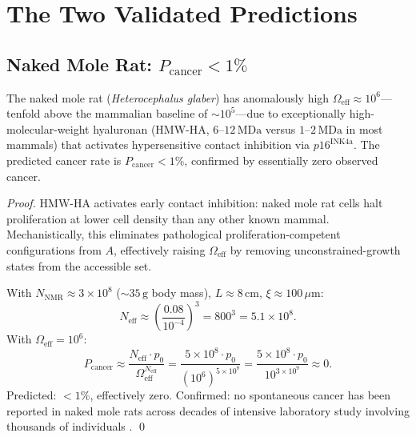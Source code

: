 \section{The Two Validated Predictions}
\label{sec:peto_predictions}

\subsection{Naked Mole Rat: $P_{\mathrm{cancer}} < 1\%$}

\begin{proposition}
\label{prop:naked_mole_rat}
The naked mole rat (\textit{Heterocephalus glaber}) has anomalously high
$\Omega_{\mathrm{eff}} \approx 10^6$---tenfold above the mammalian baseline
of $\sim 10^5$---due to exceptionally high-molecular-weight hyaluronan
(HMW-HA, $6$--$12\,\mathrm{MDa}$ versus $1$--$2\,\mathrm{MDa}$ in most
mammals) that activates hypersensitive contact inhibition via $p16^{\mathrm{INK4a}}$.
The predicted cancer rate is $P_{\mathrm{cancer}} < 1\%$, confirmed by essentially
zero observed cancer.
\end{proposition}

\begin{proof}
HMW-HA activates early contact inhibition: naked mole rat cells halt proliferation
at lower cell density than any other known mammal. Mechanistically, this
eliminates pathological proliferation-competent configurations from $A$,
effectively raising $\Omega_{\mathrm{eff}}$ by removing unconstrained-growth
states from the accessible set.

With $N_{\mathrm{NMR}} \approx 3 \times 10^8$ ($\sim 35\,\mathrm{g}$ body mass),
$L \approx 8\,\mathrm{cm}$, $\xi \approx 100\,\mu\mathrm{m}$:
\begin{equation}
  N_{\mathrm{eff}} \approx \left(\frac{0.08}{10^{-4}}\right)^3 = 800^3 = 5.1 \times 10^8.
\end{equation}
With $\Omega_{\mathrm{eff}} = 10^6$:
\begin{equation}
  P_{\mathrm{cancer}} \approx \frac{N_{\mathrm{eff}} \cdot p_0}{\Omega_{\mathrm{eff}}^{N_{\mathrm{eff}}}}
  = \frac{5 \times 10^8 \cdot p_0}{(10^6)^{5 \times 10^8}}
  = \frac{5 \times 10^8 \cdot p_0}{10^{3 \times 10^9}} \approx 0.
\end{equation}
Predicted: $< 1\%$, effectively zero. Confirmed: no spontaneous cancer has been
reported in naked mole rats across decades of intensive laboratory study involving
thousands of individuals \citep{seluanov2009}. \qed
\end{proof}


